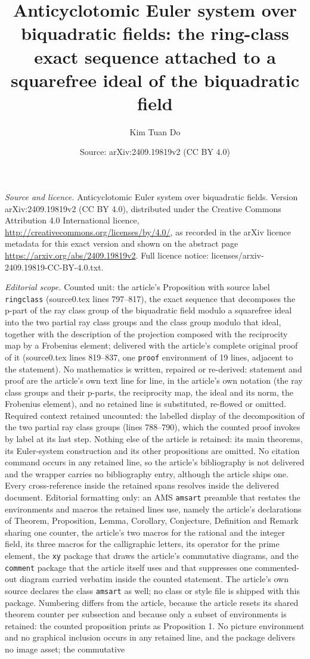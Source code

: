 \documentclass[10pt,a4paper]{amsart}
\title[Anticyclotomic Euler systems]{Anticyclotomic Euler system over biquadratic fields: the ring-class exact sequence attached to a squarefree ideal of the biquadratic field}
\author[K. T. Do]{Kim Tuan Do}
\date{Source: arXiv:2409.19819v2 (CC BY 4.0)}
\theoremstyle{plain}
\theoremstyle{definition}
\theoremstyle{remark}
\begin{document}
\maketitle
\noindent\emph{Source and licence.} Anticyclotomic Euler system over biquadratic fields. Version arXiv:2409.19819v2 (CC BY 4.0), distributed under the Creative Commons Attribution 4.0 International licence, \url{http://creativecommons.org/licenses/by/4.0/}, as recorded in the arXiv licence metadata for this exact version and shown on the abstract page \url{https://arxiv.org/abs/2409.19819v2}. Full licence notice: licenses/arxiv-2409.19819-CC-BY-4.0.txt.\par\smallskip

\noindent\textit{Editorial scope.} Counted unit: the article's Proposition with source label \texttt{ringclass} (source0.tex lines 797--817), the exact sequence that decomposes the p-part of the ray class group of the biquadratic field modulo a squarefree ideal into the two partial ray class groups and the class group modulo that ideal, together with the description of the projection composed with the reciprocity map by a Frobenius element; delivered with the article's complete original proof of it (source0.tex lines 819--837, one \texttt{proof} environment of 19 lines, adjacent to the statement). No mathematics is written, repaired or re-derived: statement and proof are the article's own text line for line, in the article's own notation (the ray class groups and their p-parts, the reciprocity map, the ideal and its norm, the Frobenius element), and no retained line is substituted, re-flowed or omitted. Required context retained uncounted: the labelled display of the decomposition of the two partial ray class groups (lines 788--790), which the counted proof invokes by label at its last step. Nothing else of the article is retained: its main theorems, its Euler-system construction and its other propositions are omitted. No citation command occurs in any retained line, so the article's bibliography is not delivered and the wrapper carries no bibliography entry, although the article ships one. Every cross-reference inside the retained spans resolves inside the delivered document. Editorial formatting only: an AMS \texttt{amsart} preamble that restates the environments and macros the retained lines use, namely the article's declarations of Theorem, Proposition, Lemma, Corollary, Conjecture, Definition and Remark sharing one counter, the article's two macros for the rational and the integer field, its three macros for the calligraphic letters, its operator for the prime element, the \texttt{xy} package that draws the article's commutative diagrams, and the \texttt{comment} package that the article itself uses and that suppresses one commented-out diagram carried verbatim inside the counted statement. The article's own source declares the class \texttt{amsart} as well; no class or style file is shipped with this package. Numbering differs from the article, because the article resets its shared theorem counter per subsection and because only a subset of environments is retained: the counted proposition prints as Proposition 1. No picture environment and no graphical inclusion occurs in any retained line, and the package delivers no image asset; the commutative 
\end{document}
